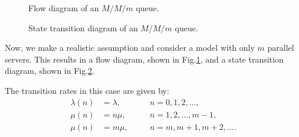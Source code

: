 \documentclass[11pt, a4paper]{report}
\begin{document}
\begin{figure}[ht]   
        \centering
        
        \caption{Flow diagram of an $M/M/m$ queue.}
    \label{fig:mmm_blk}
\end{figure}
\begin{figure}[ht]   
    \centering
    
    \caption{State transition diagram of an $M/M/m$ queue.}
\label{fig:mmm_std}
\end{figure}
Now, we make a realistic assumption and consider a model with only $m$ parallel servers. This results in a flow diagram, shown in Fig.\ref{fig:mmm_blk}, and a state transition diagram, shown in Fig.\ref{fig:mmm_std}. 

The transition rates in this case are given by:
\begin{align}
    \lambda(n) &= \lambda, && \quad n = 0, 1, 2, \ldots, \\
    \mu(n) &= n \mu, && \quad n = 1, 2, \ldots, m - 1, \\
    \mu(n) &= m \mu, && \quad n = m, m+1, m+2, \ldots.   
\end{align}
\end{document}
